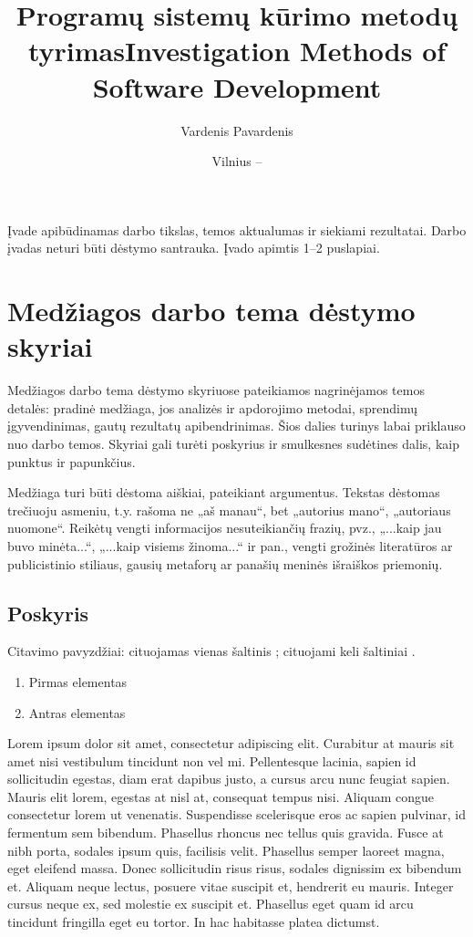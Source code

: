 \documentclass{VUMIFPSkursinis}
\title{Programų sistemų kūrimo metodų tyrimas}
\title{Investigation Methods of Software Development}
\author{Vardenis Pavardenis}
\date{Vilnius – \the\year}
\begin{document}
	
\maketitle
\cleardoublepage{}
\setcounter{page}{2}

\tableofcontents

Įvade apibūdinamas darbo tikslas, temos aktualumas ir siekiami rezultatai.
Darbo įvadas neturi būti dėstymo santrauka. Įvado apimtis 1–2 puslapiai.

\section{Medžiagos darbo tema dėstymo skyriai}
Medžiagos darbo tema dėstymo skyriuose pateikiamos nagrinėjamos temos detalės:
pradinė medžiaga, jos analizės ir apdorojimo metodai, sprendimų įgyvendinimas,
gautų rezultatų apibendrinimas. Šios dalies turinys labai priklauso nuo darbo
temos. Skyriai gali turėti poskyrius ir smulkesnes sudėtines dalis, kaip
punktus ir papunkčius.

Medžiaga turi būti dėstoma aiškiai, pateikiant argumentus. Tekstas dėstomas
trečiuoju asmeniu, t.y. rašoma ne „aš manau“, bet „autorius mano“, „autoriaus
nuomone“. Reikėtų vengti informacijos nesuteikiančių frazių, pvz., „...kaip jau
buvo minėta...“, „...kaip visiems žinoma...“ ir pan., vengti grožinės literatūros
ar publicistinio stiliaus, gausių metaforų ar panašių meninės išraiškos
priemonių.

\subsection{Poskyris}
Citavimo pavyzdžiai: cituojamas vienas šaltinis \cite{PvzStraipsnLt}; cituojami
keli šaltiniai \cite{PvzStraipsnEn, PvzKonfLt, PvzKonfEn, PvzKnygLt, PvzKnygEn,
PvzElPubLt, PvzElPubEn, PvzMagistrLt, PvzPhdEn}.

\begin{enumerate}
	\item Pirmas elementas
	\item Antras elementas
\end{enumerate}

Lorem ipsum dolor sit amet, consectetur adipiscing elit. Curabitur at mauris sit amet nisi vestibulum tincidunt non vel mi. Pellentesque lacinia, sapien id sollicitudin egestas, diam erat dapibus justo, a cursus arcu nunc feugiat sapien. Mauris elit lorem, egestas at nisl at, consequat tempus nisi. Aliquam congue consectetur lorem ut venenatis. Suspendisse scelerisque eros ac sapien pulvinar, id fermentum sem bibendum. Phasellus rhoncus nec tellus quis gravida. Fusce at nibh porta, sodales ipsum quis, facilisis velit. Phasellus semper laoreet magna, eget eleifend massa. Donec sollicitudin risus risus, sodales dignissim ex bibendum et. Aliquam neque lectus, posuere vitae suscipit et, hendrerit eu mauris. Integer cursus neque ex, sed molestie ex suscipit et. Phasellus eget quam id arcu tincidunt fringilla eget eu tortor. In hac habitasse platea dictumst.
\end{document}
